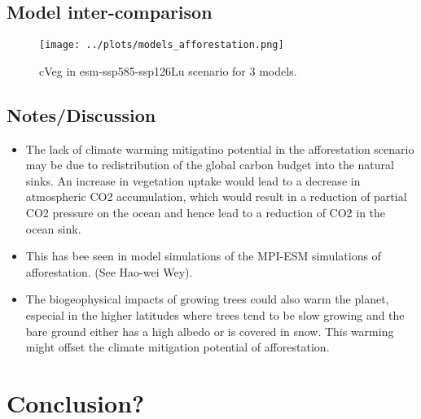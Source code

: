 \documentclass[]{article}
\begin{document}
\subsection{Model inter-comparison}

\begin{figure}[H]
    \centering
    \texttt{[image: ../plots/models\_afforestation.png]}
    \caption{cVeg in esm-ssp585-ssp126Lu scenario for 3 models.}
    \label{fig:aus_region}
\end{figure}

\subsection{Notes/Discussion}

\begin{itemize}
    \item The lack of climate warming mitigatino potential in the afforestation scenario may be due to redistribution of the global carbon budget into the natural sinks.
        An increase in vegetation uptake would lead to a decrease in atmospheric CO2 accumulation, which would result in a reduction of partial CO2 pressure on the ocean and hence lead to a reduction of CO2 in the ocean sink.
    \item This has bee seen in model simulations of the MPI-ESM simulations of afforestation. (See Hao-wei Wey).
    \item The biogeophysical impacts of growing trees could also warm the planet, especial in the higher latitudes where trees tend to be slow growing and the bare ground either has a high albedo or is covered in snow. This warming might offset the climate mitigation potential of afforestation.
\end{itemize}

\section{Conclusion?}

\printbibliography
\end{document}
